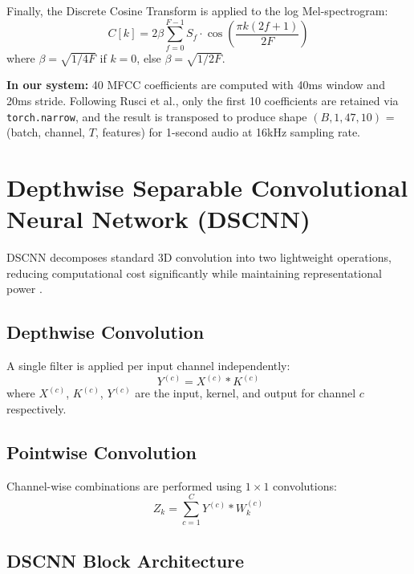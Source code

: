 \documentclass[12pt,a4paper]{report}
\begin{document}
Finally, the Discrete Cosine Transform is applied to the log Mel-spectrogram:
\begin{equation}
    C[k] = 2\beta \sum_{f=0}^{F-1} S_f \cdot \cos\left(\frac{\pi k(2f+1)}{2F}\right)
    \label{eq:mfcc}
\end{equation}
where $\beta = \sqrt{1/4F}$ if $k=0$, else $\beta = \sqrt{1/2F}$.

\textbf{In our system:} 40 MFCC coefficients are computed with 40ms window and 20ms stride.
Following Rusci et al., only the first 10 coefficients are retained via \texttt{torch.narrow},
and the result is transposed to produce shape $(B, 1, 47, 10)$ = (batch, channel, $T$, features)
for 1-second audio at 16kHz sampling rate.


\section{Depthwise Separable Convolutional Neural Network (DSCNN)}
\label{sec:dscnn}

DSCNN decomposes standard 3D convolution into two lightweight operations,
reducing computational cost significantly while maintaining representational
power \cite{zhang2017hello}.

\subsection{Depthwise Convolution}

A single filter is applied per input channel independently:
\begin{equation}
    Y^{(c)} = X^{(c)} * K^{(c)}
\end{equation}
where $X^{(c)}$, $K^{(c)}$, $Y^{(c)}$ are the input, kernel, and output for
channel $c$ respectively.

\subsection{Pointwise Convolution}

Channel-wise combinations are performed using $1 \times 1$ convolutions:
\begin{equation}
    Z_k = \sum_{c=1}^{C} Y^{(c)} * W_k^{(c)}
\end{equation}

\subsection{DSCNN Block Architecture}
\end{document}
